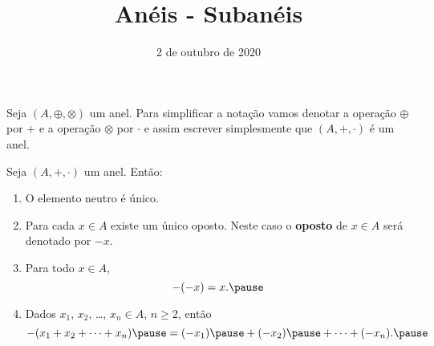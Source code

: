 \documentclass{beamer}
\title{An\'eis - Suban\'eis}
\author[\autor]{\autor}
\institute[\instituto]{\instituto}
\date{2 de outubro de 2020}
\begin{document}
    \begin{frame}
        \maketitle
    \end{frame}

    
    \begin{frame}
        \begin{observacao}
            Seja $(A, \oplus, \otimes)$ \pause um anel. \pause Para simplificar a nota\c{c}\~ao \pause vamos denotar a opera\c{c}\~ao $\oplus$ \pause por $+$ \pause e a opera\c{c}\~ao $\otimes$ \pause por $\cdot$ \pause e assim escrever simplesmente \pause que $(A, +, \cdot)$ \pause \'e um anel.\pause
        \end{observacao}
    \end{frame}

    \begin{frame}
        \begin{proposicao}
            Seja $(A, + , \cdot)$ um anel. \pause Ent\~ao:\pause
            \begin{enumerate}[label={\roman*})]
                \item O elemento neutro {\'e} {\'u}nico.\pause

                \vspace{.5cm}

                \item Para cada $x \in A$ \pause existe um {\'u}nico oposto. \pause Neste caso o \textbf{oposto} de $x \in A$ \pause ser\'a denotado por $-x$.\pause

                \vspace{.5cm}
                
                \item Para todo $x \in A$, \pause
                \[
                    -(-x) = x.\pause
                \]

                \vspace{.5cm}
                
                \item Dados $x_{1}$, \pause $x_{2}$, \pause \dots, $x_n \in A$, \pause $n \geqslant 2$, \pause ent{\~a}o\pause
                \[
                    -(x_1 + x_2 + \dots + x_n) \pause = (-x_1) \pause + (-x_2) \pause + \dots + (-x_n).\pause
                \]

                \vspace{.2cm}

                \seti
            \end{enumerate}
        \end{proposicao}
    \end{frame}
\end{document}
